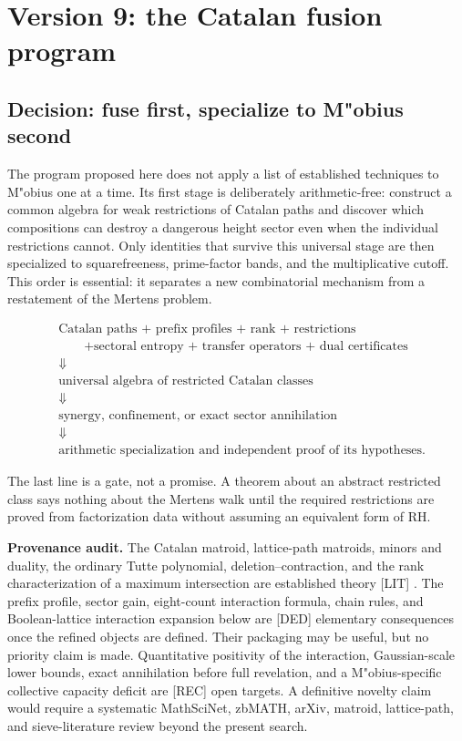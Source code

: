 \documentclass[11pt]{amsart}
\numberwithin{equation}{section}
\theoremstyle{plain}
\theoremstyle{definition}
\theoremstyle{remark}
\begin{document}
\section{Version 9: the Catalan fusion program}
\label{sec:v9_fusion_program}

\subsection{Decision: fuse first, specialize to M"obius second}

The program proposed here does not apply a list of established techniques to
M"obius one at a time.  Its first stage is deliberately arithmetic-free:
construct a common algebra for weak restrictions of Catalan paths and discover
which compositions can destroy a dangerous height sector even when the
individual restrictions cannot.  Only identities that survive this universal
stage are then specialized to squarefreeness, prime-factor bands, and the
multiplicative cutoff.  This order is essential: it separates a new
combinatorial mechanism from a restatement of the Mertens problem.

\begin{equation}
\boxed{
\begin{aligned}
&\text{Catalan paths + prefix profiles + rank + restrictions}\\
&\qquad +\text{sectoral entropy + transfer operators + dual certificates}
\\[-2mm]
&\Downarrow\\
&\text{universal algebra of restricted Catalan classes}
\\[-2mm]
&\Downarrow\\
&\text{synergy, confinement, or exact sector annihilation}
\\[-2mm]
&\Downarrow\\
&\text{arithmetic specialization and independent proof of its hypotheses}.
\end{aligned}}
\label{eq:v9_dependency_spine}
\end{equation}

The last line is a gate, not a promise.  A theorem about an abstract restricted
class says nothing about the Mertens walk until the required restrictions are
proved from factorization data without assuming an equivalent form of RH.

\medskip\noindent\textbf{Provenance audit.}
The Catalan matroid, lattice-path matroids, minors and duality, the ordinary
Tutte polynomial, deletion--contraction, and the rank characterization of a
maximum intersection are established theory \textup{[LIT]}
\cite{ArdilaCatalanMatroid,BoninDeMierNoy}.  The prefix profile, sector gain,
eight-count interaction formula, chain rules, and Boolean-lattice interaction
expansion below are \textup{[DED]} elementary consequences once the refined
objects are defined.  Their packaging may be useful, but no priority claim is
made.  Quantitative positivity of the interaction, Gaussian-scale lower bounds,
exact annihilation before full revelation, and a M"obius-specific collective
capacity deficit are \textup{[REC]} open targets.  A definitive novelty claim
would require a systematic MathSciNet, zbMATH, arXiv, matroid, lattice-path,
and sieve-literature review beyond the present search.
\end{document}
